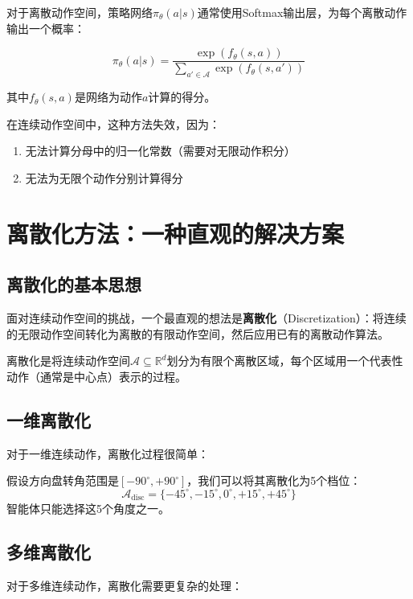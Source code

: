 对于离散动作空间，策略网络$\pi_\theta(a|s)$通常使用Softmax输出层，为每个离散动作输出一个概率：

\[
\pi_\theta(a|s) = \frac{\exp(f_\theta(s,a))}{\sum_{a' \in \mathcal{A}} \exp(f_\theta(s,a'))}
\]

其中$f_\theta(s,a)$是网络为动作$a$计算的得分。

在连续动作空间中，这种方法失效，因为：
\begin{enumerate}
    \item 无法计算分母中的归一化常数（需要对无限动作积分）
    \item 无法为无限个动作分别计算得分
\end{enumerate}

\section{离散化方法：一种直观的解决方案}

\subsection{离散化的基本思想}

面对连续动作空间的挑战，一个最直观的想法是\textbf{离散化}（Discretization）：将连续的无限动作空间转化为离散的有限动作空间，然后应用已有的离散动作算法。

\begin{definition}[离散化]
离散化是将连续动作空间$\mathcal{A} \subseteq \mathbb{R}^d$划分为有限个离散区域，每个区域用一个代表性动作（通常是中心点）表示的过程。
\end{definition}

\subsection{一维离散化}

对于一维连续动作，离散化过程很简单：

\begin{example}[方向盘转角离散化]
假设方向盘转角范围是$[-90^\circ, +90^\circ]$，我们可以将其离散化为5个档位：
\[
\mathcal{A}_{\text{disc}} = \{-45^\circ, -15^\circ, 0^\circ, +15^\circ, +45^\circ\}
\]
智能体只能选择这5个角度之一。
\end{example}

\subsection{多维离散化}

对于多维连续动作，离散化需要更复杂的处理：

